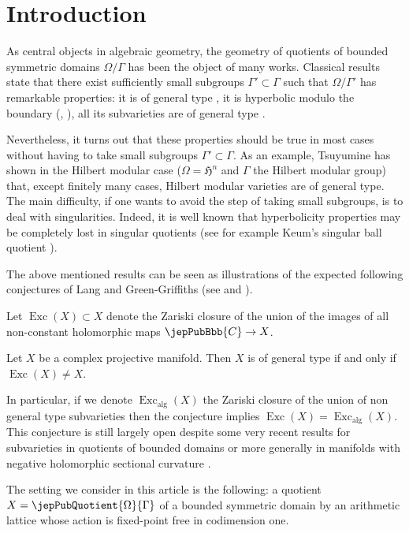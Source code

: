 \section{Introduction}
As central objects in algebraic geometry, the geometry of quotients of bounded symmetric domains $\Omega/\Gamma$ has been the object of many works. Classical results state that there exist sufficiently small subgroups $\Gamma' \subset \Gamma$ such that $\Omega/\Gamma'$ has remarkable properties: it is of general type \cite{pubref23}, it is hyperbolic modulo the boundary (\cite{pubref24}, \cite{pubref26}), all its subvarieties are of general type \cite{pubref05}.


Nevertheless, it turns out that these properties should be true in most cases without having to take small subgroups $\Gamma' \subset \Gamma$. As an example, Tsuyumine \cite{pubref29} has shown in the Hilbert modular case ($\Omega=\mathfrak{H}^n$ and $\Gamma$ the Hilbert modular group) that, except finitely many cases, Hilbert modular varieties are of general type. The main difficulty, if one wants to avoid the step of taking small subgroups, is to deal with singularities. Indeed, it is well known that hyperbolicity properties may be completely lost in singular quotients (see for example Keum's singular ball quotient \cite{pubref18}).

The above mentioned results can be seen as illustrations of the expected following conjectures of Lang and Green-Griffiths (see \cite{pubref21} and \cite{pubref11}).

Let $\operatorname{Exc}(X) \subset X$ denote the Zariski closure of the union of the images of all non-constant holomorphic maps $\jepPubBbb{C} \to X$.

\begin{conjecture}\label{published:01}
Let $X$ be a complex projective manifold. Then $X$ is of general type if and only if $\operatorname{Exc}(X) \neq X$.
\end{conjecture}

In particular, if we denote $\operatorname{Exc}_{\text{alg}}(X)$ the Zariski closure of the union of non general type subvarieties then the conjecture implies $\operatorname{Exc}(X)=\operatorname{Exc}_{\text{alg}}(X).$
This conjecture is still largely open despite some very recent results for subvarieties in quotients of bounded domains \cite{pubref03} or more generally in manifolds with negative holomorphic sectional curvature \cite{pubref16}.

The setting we consider in this article is the following: a quotient $X = \jepPubQuotient{\Omega}{\Gamma}$ of a  bounded symmetric domain by an arithmetic lattice whose action is fixed-point free in codimension one.

